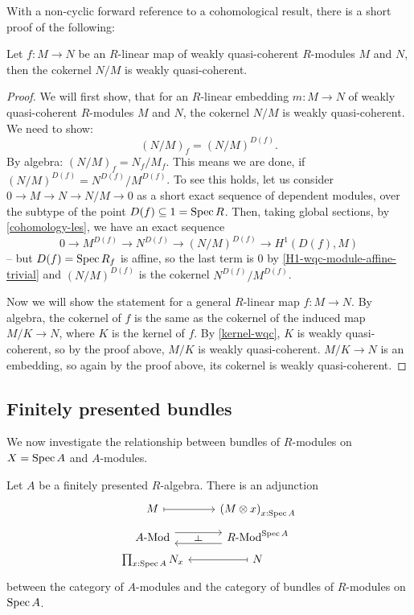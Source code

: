 With a non-cyclic forward reference to a cohomological result,
there is a short proof of the following:

\begin{proposition}%
  Let $f:M\to N$ be an $R$-linear map of weakly quasi-coherent $R$-modules $M$ and $N$,
  then the cokernel $N/M$ is weakly quasi-coherent.
\end{proposition}

\begin{proof}
  We will first show, that for an $R$-linear embedding $m:M\to N$
  of weakly quasi-coherent $R$-modules $M$ and $N$,
  the cokernel $N/M$ is weakly quasi-coherent.
  We need to show:
  \[
    (N/M)_f=(N/M)^{D(f)}.
  \]
  By algebra: $(N/M)_f=N_f/M_f$.
  This means we are done, if $(N/M)^{D(f)}=N^{D(f)}/{M^{D(f)}}$.
  To see this holds, let us consider $0\to M\to N\to N/M\to 0$ as a short exact sequence of dependent modules,
  over the subtype of the point $D(f)\subseteq 1=\operatorname{Spec} R$.
  Then, taking global sections, by \cref{cohomology-les},
  we have an exact sequence
  \[
    0\to M^{D(f)}\to N^{D(f)}\to (N/M)^{D(f)}\to H^1(D(f),M)
  \]
  -- but $D(f)=\operatorname{Spec} R_f$ is affine,
  so the last term is 0 by \cref{H1-wqc-module-affine-trivial}
  and $(N/M)^{D(f)}$ is the cokernel $N^{D(f)}/M^{D(f)}$.

  Now we will show the statement for a general $R$-linear map $f:M\to N$.
  By algebra, the cokernel of $f$ is the same as the cokernel of the induced map
  $M/K\to N$, where $K$ is the kernel of $f$.
  By \cref{kernel-wqc}, $K$ is weakly quasi-coherent, so by the proof above,
  $M/K$ is weakly quasi-coherent.
  $M/K\to N$ is an embedding, so again by the proof above, its cokernel is weakly quasi-coherent.
\end{proof}

\subsection{Finitely presented bundles}

We now investigate the relationship between bundles of $R$-modules on $X = \operatorname{Spec} A$
and $A$-modules.

\begin{proposition}
  Let $A$ be a finitely presented $R$-algebra.
  There is an adjunction
  \[ \begin{tikzcd}[row sep=tiny]
    M \ar[r, mapsto] & {(M \otimes x)}_{x : \Spec A} \\
    \Mod{A} \ar[r, shift left=2] \ar[r, phantom, "\rotatebox{90}{$\vdash$}"] &
    \Mod{R}^{\Spec A} \ar[l, shift left=2] \\
    \prod_{x : \Spec A} N_x & N \ar[l, mapsto]
  \end{tikzcd} \]
  between the category of $A$-modules
  and the category of bundles of $R$-modules on $\operatorname{Spec} A$.
\end{proposition}

